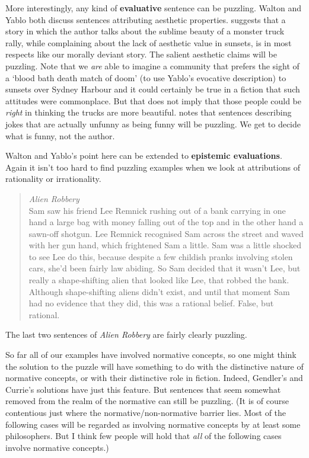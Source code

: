 More interestingly, any kind of \textbf{evaluative} sentence can be puzzling. Walton and Yablo both discuss sentences attributing aesthetic properties. \cite[485]{Yablo2002} suggests that a story in which the author talks about the sublime beauty of a monster truck rally, while complaining about the lack of aesthetic value in sunsets, is in most respects like our morally deviant story. The salient aesthetic claims will be puzzling. Note that we \textit{are }able to imagine a community that prefers the sight of a `blood bath death match of doom' (to use Yablo's evocative description) to sunsets over Sydney Harbour and it could certainly be true in a fiction that such attitudes were commonplace. But that does not imply that those people could be \textit{right} in thinking the trucks are more beautiful. \cite[43-44]{Walton1994} notes that sentences describing jokes that are actually unfunny as being funny will be puzzling. We get to decide what is funny, not the author.

Walton and Yablo's point here can be extended to \textbf{epistemic evaluations}. Again it isn't too hard to find puzzling examples when we look at attributions of rationality or irrationality.

\begin{quote}
\textit{Alien Robbery} \\
Sam saw his friend Lee Remnick rushing out of a bank carrying in one hand a large bag with money falling out of the top and in the other hand a sawn-off shotgun. Lee Remnick recognised Sam across the street and waved with her gun hand, which frightened Sam a little. Sam was a little shocked to see Lee do this, because despite a few childish pranks involving stolen cars, she'd been fairly law abiding. So Sam decided that it wasn't Lee, but really a shape-shifting alien that looked like Lee, that robbed the bank. Although shape-shifting aliens didn't exist, and until that moment Sam had no evidence that they did, this was a rational belief. False, but rational.
\end{quote}

\noindent The last two sentences of \textit{Alien Robbery} are fairly clearly puzzling.

So far all of our examples have involved normative concepts, so one might think the solution to the puzzle will have something to do with the distinctive nature of normative concepts, or with their distinctive role in fiction. Indeed, Gendler's and Currie's solutions have just this feature. But sentences that seem somewhat removed from the realm of the normative can still be puzzling. (It is of course contentious just where the normative/non-normative barrier lies. Most of the following cases will be regarded as involving normative concepts by at least some philosophers. But I think few people will hold that \textit{all} of the following cases involve normative concepts.)

